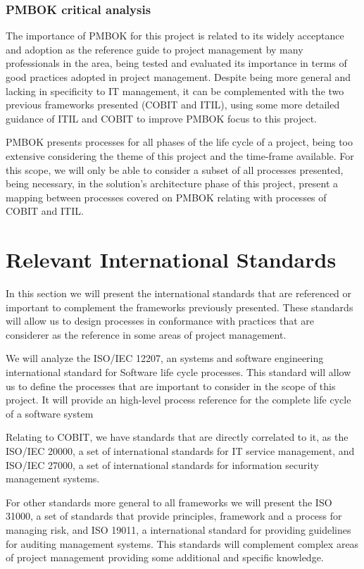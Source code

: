 \subsubsection{PMBOK critical analysis}

The importance of PMBOK for this project is related to its widely acceptance and adoption as the reference guide to project management by many professionals in the area, being tested and evaluated its importance in terms of good practices adopted in project management. Despite being more general and lacking in specificity to IT management, it can be complemented with the two previous frameworks presented (COBIT and ITIL), using some more detailed guidance of ITIL and COBIT to improve PMBOK focus to this project.\par
PMBOK presents processes for all phases of the life cycle of a project, being too extensive considering the theme of this project and the time-frame available. For this scope, we will only be able to consider a subset of all processes presented, being necessary, in the solution's architecture phase of this project, present a mapping between processes covered on PMBOK relating with processes of COBIT and ITIL.


\section{Relevant International Standards}

In this section we will present the international standards that are referenced or important to complement the frameworks previously presented. These standards will allow us to design processes in conformance with practices that are considerer as the reference in some areas of project management.\par
We will analyze the ISO/IEC 12207\cite{ISO12207}, an systems and software engineering international standard for Software life cycle processes. This standard will allow us to define the processes that are important to consider in the scope of this project. It will provide an high-level process reference for the complete life cycle of a software system\par
Relating to COBIT, we have standards that are directly correlated to it, as the ISO/IEC 20000\cite{ISO20000-1,ISO20000-2,ISO20000-3,ISO20000-4,ISO20000-5}, a set of international standards for IT service management, and ISO/IEC 27000\cite{ISO27000}, a set of international standards for information security management systems.\par
For other standards more general to all frameworks we will present the ISO 31000\cite{ISO31000,IEC31010}, a set of standards that provide principles, framework and a process for managing risk, and ISO 19011\cite{ISO19011}, a international standard for providing guidelines for auditing management systems. This standards will complement complex areas of project management providing some additional and specific knowledge.

